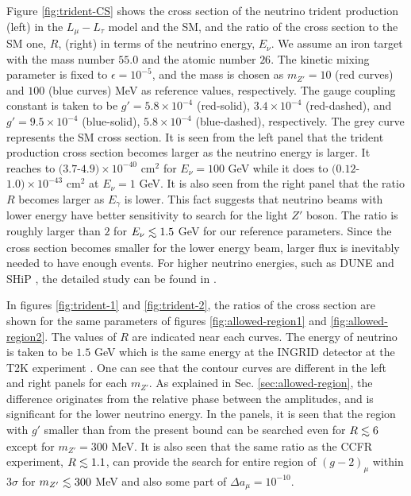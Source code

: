 \documentclass[preprint,amsmath,amssymb,superscriptaddress,nofootinbib]{revtex4}
\newcommand{\lsim}{\raise0.3ex\hbox{$\;<$\kern-0.75em\raise-1.1ex\hbox{$\sim\;$}}}
\begin{document}
Figure \ref{fig:trident-CS} shows the cross section of the neutrino trident production (left) 
in the $L_\mu - L_\tau$ model and the SM, and the ratio of the cross  section to the SM one, $R$, (right) 
in terms of the neutrino energy, $E_\nu$.  We assume an iron target with the mass number $55.0$ and the atomic number $26$.
The kinetic mixing parameter is fixed to $\epsilon = 10^{-5}$, 
%
and the mass is chosen as $m_{Z'}=10$ (red curves) and $100$ (blue curves) MeV as reference values, respectively. 
The gauge coupling constant is taken to be  $g'=5.8 \times 10^{-4}$ (red-solid), $3.4 \times 10^{-4}$ (red-dashed), 
and $g'=9.5 \times 10^{-4}$ (blue-solid), $5.8 \times 10^{-4}$ (blue-dashed), respectively.
The grey curve represents the SM cross section. 
It is seen from the left panel that the trident production cross section becomes larger as the neutrino energy is larger.
It reaches to $(3.7$-$4.9)\times 10^{-40}$ cm$^2$ for $E_\nu = 100$ GeV while it does to $(0.12$-$1.0) \times 10^{-43}$ cm$^2$ 
at $E_\nu = 1$ GeV.
It is also seen from the right panel that the ratio $R$  
becomes larger as $E_\gamma$ is lower. This fact suggests that neutrino beams with lower energy have better sensitivity 
to search for the light $Z'$ boson. The ratio is roughly larger than $2$ for $E_\nu \lsim 1.5$ GeV for our reference parameters. 
Since the cross section becomes smaller for the lower energy beam, larger flux is inevitably needed to have enough events. 
For higher neutrino energies, such as DUNE \cite{Acciarri:2015uup} and SHiP \cite{ Anelli:2015pba}, 
the detailed study can be found in \cite{Magill:2016hgc}.


In figures \ref{fig:trident-1} and \ref{fig:trident-2}, the ratios of the cross section are shown for the same parameters of 
figures \ref{fig:allowed-region1} and \ref{fig:allowed-region2}. The values of $R$ are indicated near each curves. The 
energy of neutrino is taken to be $1.5$ GeV which is the same energy at the INGRID detector at the T2K experiment \cite{Abe:2011ks}. 
%
One can see that the contour curves are different in the left and right panels for each $m_{Z'}$. 
As explained in Sec. \ref{sec:allowed-region}, the difference originates from the relative phase between the amplitudes, 
and is significant for the lower neutrino energy. 
%
In the panels, it is seen that the region with $g'$ smaller than from the present bound can be searched even for $R \lsim 6$ 
except for $m_{Z'} = 300$ MeV. 
It is also seen that the same ratio as the CCFR experiment, $R\lsim1.1$, can provide the search for entire region of 
$(g-2)_\mu$ within $3\sigma$ for $m_{Z'} \lsim 300$ MeV and also some part of $\Delta a_\mu = 10^{-10}$. 
\end{document}
